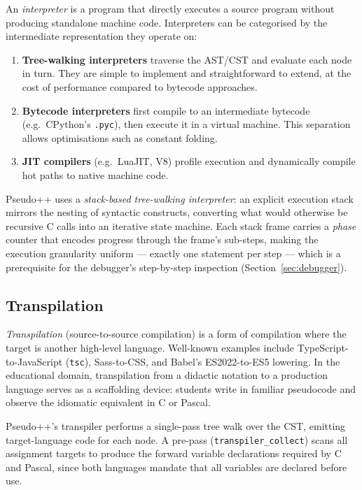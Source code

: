 An \textit{interpreter} is a program that directly executes a source program without
producing standalone machine code.  Interpreters can be categorised by the
intermediate representation they operate on:

\begin{enumerate}
  \item \textbf{Tree-walking interpreters} traverse the AST/CST and evaluate each
        node in turn.  They are simple to implement and straightforward to extend, at
        the cost of performance compared to bytecode approaches.

  \item \textbf{Bytecode interpreters} first compile to an intermediate bytecode
        (e.g.\ CPython's \texttt{.pyc}), then execute it in a virtual machine.
        This separation allows optimisations such as constant folding.

  \item \textbf{JIT compilers} (e.g.\ LuaJIT, V8) profile execution and
        dynamically compile hot paths to native machine code.
\end{enumerate}

Pseudo++ uses a \textit{stack-based tree-walking interpreter}: an explicit execution
stack mirrors the nesting of syntactic constructs, converting what would otherwise be
recursive C calls into an iterative state machine.  Each stack frame carries a
\textit{phase} counter that encodes progress through the frame's sub-steps, making
the execution granularity uniform --- exactly one statement per step --- which is a
prerequisite for the debugger's step-by-step inspection (Section~\ref{sec:debugger}).

\subsection{Transpilation}

\textit{Transpilation} (source-to-source compilation) is a form of compilation where
the target is another high-level language.  Well-known examples include
TypeScript-to-JavaScript (\texttt{tsc}), Sass-to-CSS, and Babel's ES2022-to-ES5
lowering.  In the educational domain, transpilation from a didactic notation to a
production language serves as a scaffolding device: students write in familiar
pseudocode and observe the idiomatic equivalent in C or Pascal.

Pseudo++'s transpiler performs a single-pass tree walk over the CST, emitting
target-language code for each node.  A pre-pass (\texttt{transpiler\_collect}) scans
all assignment targets to produce the forward variable declarations required by C
and Pascal, since both languages mandate that all variables are declared before use.

